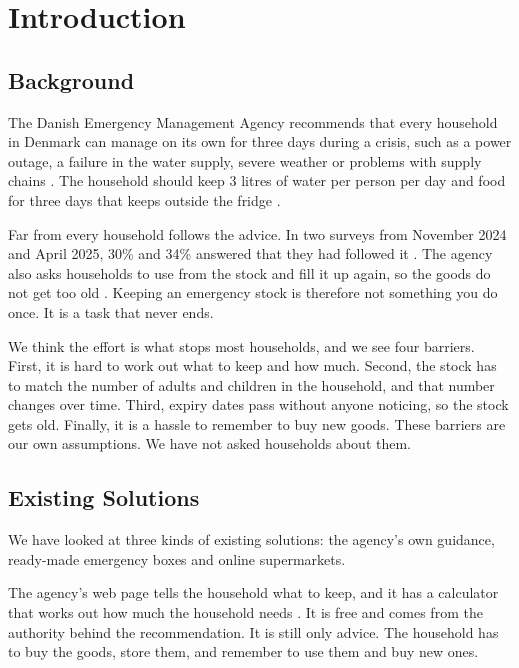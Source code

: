 \chapter{Introduction}\label{ch:introduction}

\section{Background}\label{sec:background}

The Danish Emergency Management Agency recommends that every household in Denmark
can manage on its own for three days during a crisis, such as a power outage, a
failure in the water supply, severe weather or problems with supply chains
\cite{brs-forberedt}. The household should keep 3 litres of water per person per
day and food for three days that keeps outside the fridge \cite{brs-forberedt}.

Far from every household follows the advice. In two surveys from November 2024 and
April 2025, 30\% and 34\% answered that they had followed it
\cite{mssb-fou-question-302-2025}. The agency also asks households to use from the
stock and fill it up again, so the goods do not get too old \cite{brs-forberedt}.
Keeping an emergency stock is therefore not something you do once. It is a task that
never ends.

We think the effort is what stops most households, and we see four barriers. First,
it is hard to work out what to keep and how much. Second, the stock has to match the
number of adults and children in the household, and that number changes over time.
Third, expiry dates pass without anyone noticing, so the stock gets old. Finally, it
is a hassle to remember to buy new goods. These barriers are our own assumptions. We
have not asked households about them.

\section{Existing Solutions}\label{sec:existing-solutions}

We have looked at three kinds of existing solutions: the agency's own guidance,
ready-made emergency boxes and online supermarkets.

The agency's web page tells the household what to keep, and it has a calculator that
works out how much the household needs \cite{brs-forberedt}. It is free and comes from
the authority behind the recommendation. It is still only advice. The household has to
buy the goods, store them, and remember to use them and buy new ones.

